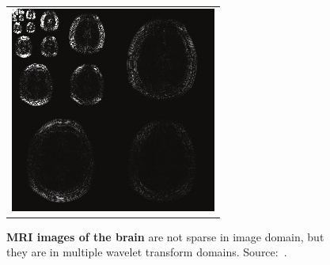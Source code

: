 \begin{figure}[tb]
\begin{minipage}[t]{0.31\linewidth}
\begin{tabular}{c}
            \\ 
            \includegraphics[width=0.65\linewidth]{images/brain_MRI_wavelet.png}
        \end{tabular}
        \caption{\textbf{MRI images of the brain} are not sparse in image domain, but they are in multiple wavelet transform domains. Source:~\cite{zhao_compressed_2014}.}
        \label{fig:brain_wavelet}
    \end{minipage}
\end{figure}

